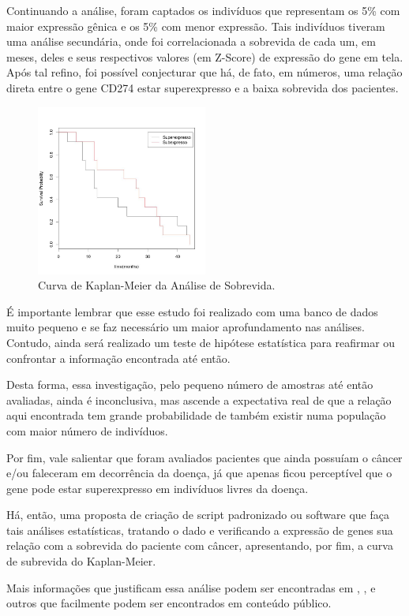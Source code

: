 \documentclass[a4paper,12pt]{article}
\begin{document}
Continuando a análise, foram captados os indivíduos que representam os 5\% com maior expressão gênica e os 5\% com menor expressão. Tais indivíduos tiveram uma análise secundária, onde foi correlacionada a sobrevida de cada um, em meses, deles e seus respectivos valores (em Z-Score) de expressão do gene em tela. Após tal refino, foi possível conjecturar que há, de fato, em números, uma relação direta entre o gene CD274 estar superexpresso e a baixa sobrevida dos pacientes.

\begin{figure}[h!]
\centering
\includegraphics[width=0.5\textwidth]{plot_AnaliseSobrevida.jpeg}
\caption{Curva de Kaplan-Meier da Análise de Sobrevida.}
\label{fig:TesteNorm}
\end{figure}

É importante lembrar que esse estudo foi realizado com uma banco de dados muito pequeno e se faz necessário um maior aprofundamento nas análises. Contudo, ainda será realizado um teste de hipótese estatística para reafirmar ou confrontar a informação encontrada até então.

Desta forma, essa investigação, pelo pequeno número de amostras até então avaliadas, ainda é inconclusiva, mas ascende a expectativa real de que a relação aqui encontrada tem grande probabilidade de também existir numa população com maior número de indivíduos. 

Por fim, vale salientar que foram avaliados pacientes que ainda possuíam o câncer e/ou faleceram em decorrência da doença, já que apenas ficou perceptível que o gene pode estar superexpresso em indivíduos livres da doença.

Há, então, uma proposta de criação de script padronizado ou software que faça tais análises estatísticas, tratando o dado e verificando a expressão de genes sua relação com a sobrevida do paciente com câncer, apresentando, por fim, a curva de subrevida do Kaplan-Meier. 

Mais informações que justificam essa análise podem ser encontradas em \cite{brahmer2012safety}, \cite{reck2016pembrolizumab}, \cite{iwai2002involvement} e outros que facilmente podem ser encontrados em conteúdo público.



\end{document}
